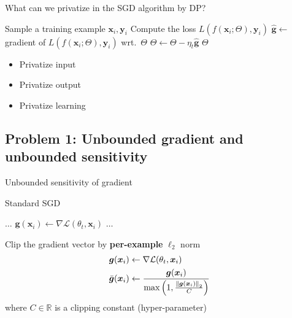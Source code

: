 \documentclass[12pt,aspectratio=169,handout]{beamer}
\begin{document}
\begin{frame}{What can we privatize in the SGD algorithm by DP?}

\begin{algorithmic}[1]
		\State Sample a training example $\bm{x}_i, \bm{y}_i$
		\State Compute the loss $L(f(\bm{x}_i; \Theta), \bm{y}_i)$
		\State $\hat{\bm{g}} \gets$ gradient of $L(f(\bm{x}_i; \Theta), \bm{y}_i)$ wrt.\ $\Theta$
		\State $\Theta \gets \Theta - \eta_t \hat{\bm{g}}$
	\EndWhile
	\State \Return $\Theta$
	\EndFunction
\end{algorithmic}

\pause
\begin{itemize}
\item Privatize input
\item Privatize output
\item Privatize learning
\end{itemize}

\end{frame}

\subsection{Problem 1: Unbounded gradient and unbounded sensitivity}

\begin{frame}{Unbounded sensitivity of gradient}

\begin{block}{Standard SGD}
\begin{algorithmic}[1]
\State $\ldots$
\State $\bm{g}(\bm{x}_i) \gets \nabla \mathcal{L} (\theta_t, \bm{x}_i)$
\State $\ldots$
\end{algorithmic}
\end{block}


Clip the gradient vector by \textbf{per-example} $\ell_2$ norm
$$
\begin{aligned}
\bm{g}(\bm{x}_i) &\gets \nabla \mathcal{L} (\theta_t, \bm{x}_i) \\
\bar{\bm{g}}(\bm{x}_i) &\gets
\frac{
\bm{g}(\bm{x}_i)
}{
\max \left(1,
\frac{\norm{\bm{g}(\bm{x}_i)}_2}{C} \right)
}
\end{aligned}
$$
where $C \in \mathbb{R}$ is a clipping constant (hyper-parameter)




\end{frame}
\end{document}
